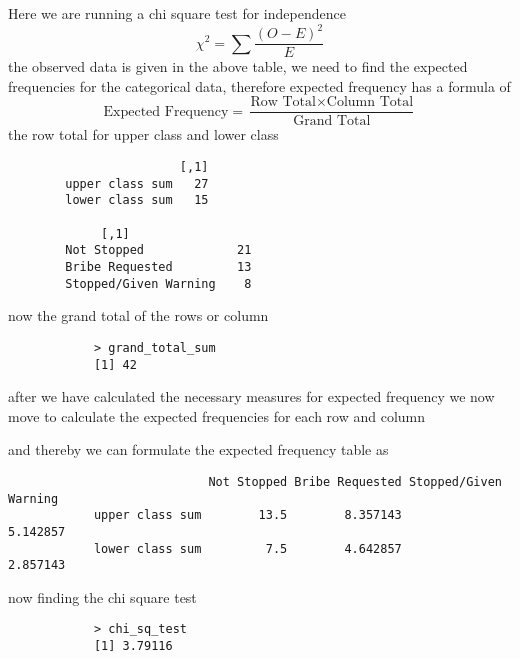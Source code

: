 \documentclass[12pt,letterpaper]{article}
\begin{document}
\begin{enumerate}
\begin{itemize}
		Here we are running a chi square test for independence 
		\[
		\chi^2 = \sum \frac{(O - E)^2}{E}
		\]
		the observed data is given in the above table, we need to find the expected frequencies for the categorical data, therefore expected frequency has a formula of 
		\[
		\text{Expected Frequency} = \frac{\text{Row Total} \times \text{Column Total}}{\text{Grand Total}}
		\]
		the row total for upper class and lower class
		
		\begin{verbatim}
		                [,1]
		upper class sum   27
		lower class sum   15
		
		     [,1]
		Not Stopped             21
		Bribe Requested         13
		Stopped/Given Warning    8
		\end{verbatim}
		now the grand total of the rows or column
		
		\begin{verbatim}
			> grand_total_sum
			[1] 42
		\end{verbatim}
		after we have calculated the necessary measures for expected frequency we now move to calculate the expected frequencies for each row and column
		
		and thereby we can formulate the expected frequency table as 
		\begin{verbatim}
			                Not Stopped Bribe Requested Stopped/Given Warning
			upper class sum        13.5        8.357143              5.142857
			lower class sum         7.5        4.642857              2.857143
		\end{verbatim}
		now finding the chi square test
		
		\begin{verbatim}
			> chi_sq_test
			[1] 3.79116
		\end{verbatim}
		

\end{itemize}
\end{enumerate}
\end{document}
